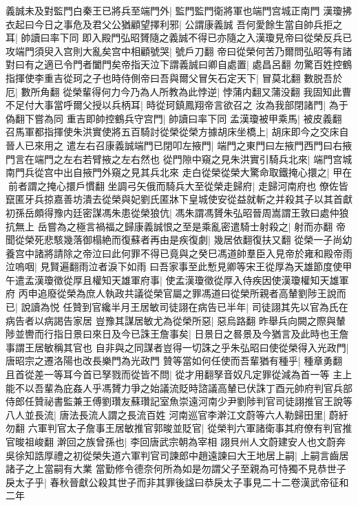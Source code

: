 義誠未及對監門白秦王已將兵至端門外|{
	監門監門衛將軍也端門宫城正南門}
漢瓊拂衣起曰今日之事危及君父公猶顧望擇利邪|{
	公謂康義誠}
吾何愛餘生當自帥兵拒之耳|{
	帥讀曰率下同}
即入殿門弘昭贇隨之義誠不得已亦隨之入漢瓊見帝曰從榮反兵已攻端門須臾入宫則大亂矣宫中相顧號哭|{
	號戶刀翻}
帝曰從榮何苦乃爾問弘昭等有諸對曰有之適已令門者闔門矣帝指天泣下謂義誠曰卿自處置|{
	處昌呂翻}
勿驚百姓控鶴指揮使李重吉從珂之子也時侍側帝曰吾與爾父冒矢石定天下|{
	冒莫北翻}
數脱吾於厄|{
	數所角翻}
從榮輩得何力今乃為人所教為此悖逆|{
	悖蒲内翻又蒲没翻}
我固知此曹不足付大事當呼爾父授以兵柄耳|{
	時從珂鎮鳳翔帝言欲召之}
汝為我部閉諸門|{
	為于偽翻下嘗為同}
重吉即帥控鶴兵守宫門|{
	帥讀曰率下同}
孟漢瓊被甲乘馬|{
	被皮義翻}
召馬軍都指揮使朱洪實使將五百騎討從榮從榮方據胡床坐橋上|{
	胡床即今之交床自晉人已來用之}
遣左右召康義誠端門已閉叩左掖門|{
	端門之東門曰左掖門西門曰右掖門言在端門之左右若臂掖之左右然也}
從門隙中窺之見朱洪實引騎兵北來|{
	端門宫城南門兵從宫中出自掖門外窺之見其兵北來}
走白從榮從榮大驚命取鐵掩心擐之|{
	甲在前者謂之掩心擐戶慣翻}
坐調弓矢俄而騎兵大至從榮走歸府|{
	走歸河南府也}
僚佐皆竄匿牙兵掠嘉善坊潰去從榮與妃劉氏匿牀下皇城使安從益就斬之并殺其子以其首獻初孫岳頗得豫内廷密謀馮朱患從榮狼伉|{
	馮朱謂馮贇朱弘昭晉周嵩謂王敦曰處仲狼抗無上}
岳嘗為之極言禍福之歸康義誠恨之至是乘亂密遣騎士射殺之|{
	射而亦翻}
帝聞從榮死悲駭幾落御榻絶而復蘇者再由是疾復劇|{
	幾居依翻復扶又翻}
從榮一子尚幼養宫中諸將請除之帝泣曰此何罪不得已竟與之癸巳馮道帥羣臣入見帝於雍和殿帝雨泣嗚咽|{
	見賢遍翻雨泣者淚下如雨}
曰吾家事至此慙見卿等宋王從厚為天雄節度使甲午遣孟漢瓊徵從厚且權知天雄軍府事|{
	使孟漢瓊徵從厚入侍疾因使漢瓊權知天雄軍府}
丙申追廢從榮為庶人執政共議從榮官屬之罪馮道曰從榮所親者高輦劉陟王說而已|{
	說讀為悦}
任贊到官纔半月王居敏司徒詡在病告已半年|{
	司徒詡其先以官為氏在病告者以病謁告家居}
豈豫其謀居敏尤為從榮所惡|{
	惡烏路翻}
昨舉兵向闕之際與輦陟並轡而行指日景曰來日及今已誅王詹事矣|{
	日景日之晷景及今猶言及此時也王詹事謂王居敏稱其官也}
自非與之同謀者豈得一切誅之乎朱弘昭曰使從榮得入光政門|{
	唐昭宗之遷洛陽也改長樂門為光政門}
贊等當如何任使而吾輩猶有種乎|{
	種章勇翻}
且首從差一等耳今首已孥戮而從皆不問|{
	從才用翻孥音奴凡定罪從減為首一等}
主上能不以吾輩為庇姦人乎馮贇力爭之始議流貶時諮議高輦已伏誅丁酉元帥府判官兵部侍郎任贊祕書監兼王傅劉瓚友蘇瓚記室魚崇遠河南少尹劉陟判官司徒詡推官王說等八人並長流|{
	唐法長流人謂之長流百姓}
河南巡官李澣江文蔚等六人勒歸田里|{
	蔚紆勿翻}
六軍判官太子詹事王居敏推官郭晙並貶官|{
	從榮判六軍諸衛事其府僚有判官推官晙祖峻翻}
澣回之族曾孫也|{
	李回唐武宗朝為宰相}
詡貝州人文蔚建安人也文蔚奔吳徐知誥厚禮之初從榮失道六軍判官司諫郎中趙遠諫曰大王地居上嗣|{
	上嗣言齒居諸子之上當嗣有大業}
當勤修令德奈何所為如是勿謂父子至親為可恃獨不見恭世子戾太子乎|{
	春秋晉獻公殺其世子而非其罪後諡曰恭戾太子事見二十二卷漢武帝征和二年}
